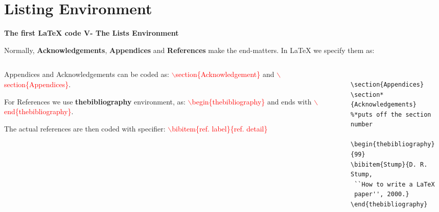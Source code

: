 \documentclass[xcolor=dvipsnames]{beamer}
\begin{document}
\section{Listing Environment}
\begin{frame}[fragile]{\textbf{The first \LaTeX{} code V- The Lists Environment}}



Normally, \textbf{Acknowledgements}, \textbf{Appendices} and \textbf{References} make the end-matters. In \LaTeX{} we specify them as:\\
\vspace{0.4cm}

\begin{columns}
\begin{column}{0.5\textwidth}

Appendices and Acknowledgements can be coded as: \textcolor{red}{$\backslash$section\{Acknowledgement\}} and \textcolor{red}{$\backslash$section\{Appendices\}}.\\
\vspace{0.2cm}

For References we use \textbf{thebibliography} environment, as:
\textcolor{red}{$\backslash$begin\{thebibliography\}} and ends with \textcolor{red}{$\backslash$end\{thebibliography\}}.\\
\vspace{0.2cm}

 The actual references are then coded with specifier:
 \textcolor{red}{$\backslash$bibitem\{ref. label\}\{ref. detail\}}

\end{column}


\begin{column}{0.52\textwidth}
\small

\begin{Verbatim}[frame=single]
% These are end-matters

\section{Appendices}
\section*{Acknowledgements} 
%*puts off the section number

\begin{thebibliography}{99}
\bibitem{Stump}{D. R. Stump,
 ``How to write a LaTeX 
 paper'', 2000.}
\end{thebibliography}
\end{Verbatim}

\end{column}

\end{columns}

\end{frame}
\end{document}

